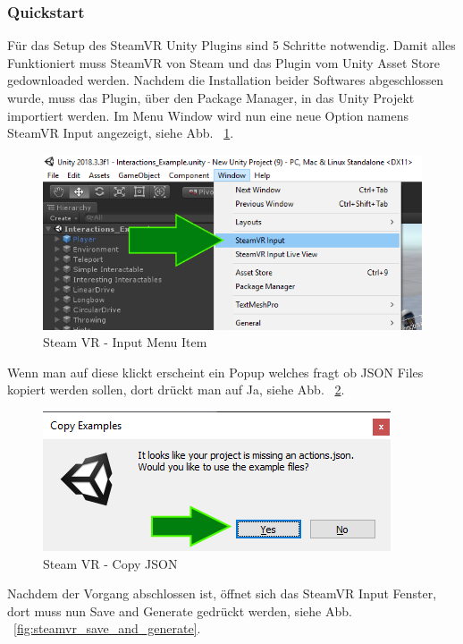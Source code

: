 \begin{itemize}
\subsubsection{Quickstart}
Für das Setup des SteamVR Unity Plugins sind 5 Schritte notwendig.
Damit alles Funktioniert muss SteamVR von Steam und das Plugin vom Unity Asset Store gedownloaded werden.
Nachdem die Installation beider Softwares abgeschlossen wurde, muss das Plugin, über den Package Manager, in das Unity Projekt importiert werden.
Im Menu Window wird nun eine neue Option namens SteamVR Input angezeigt, siehe Abb. ~\ref{fig:steamvr_input_menu_item}.
\begin {figure}
    \centering
    \includegraphics[scale=0.9]{pics/steamVR_Input_MenuItem}
    \caption{Steam VR - Input Menu Item}
    \label{fig:steamvr_input_menu_item}
\end {figure}
Wenn man auf diese klickt erscheint ein Popup welches fragt ob JSON Files kopiert werden sollen, dort drückt man auf Ja, siehe Abb. ~\ref{fig:steamvr_copy_json}.
\begin {figure}
    \centering
    \includegraphics[scale=1]{pics/steamVR_Input_CopyJSON}
    \caption{Steam VR - Copy JSON}
    \label{fig:steamvr_copy_json}
\end {figure}
Nachdem der Vorgang abschlossen ist, öffnet sich das SteamVR Input Fenster, dort muss nun Save and Generate gedrückt werden, siehe Abb. ~\ref{fig:steamvr_save_and_generate}.
\begin {figure}

\end{figure}
\end{itemize}
